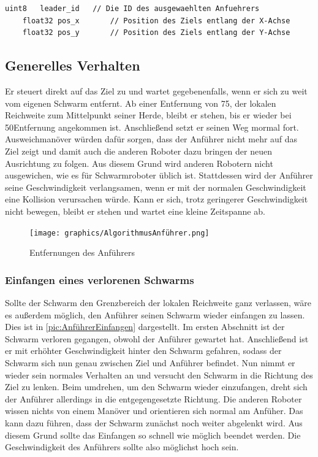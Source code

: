 \begin{lstlisting}[style=ros, title=Nachrichten-Typ: New\_Mission]
	uint8	leader_id	// Die ID des ausgewaehlten Anfuehrers
	float32 pos_x		// Position des Ziels entlang der X-Achse
	float32 pos_y		// Position des Ziels entlang der Y-Achse
\end{lstlisting}

\subsection*{Generelles Verhalten}

Er steuert direkt auf das Ziel zu und wartet gegebenenfalls, wenn er sich zu weit vom eigenen Schwarm entfernt. Ab einer Entfernung von 75\per, der lokalen Reichweite zum Mittelpunkt seiner Herde, bleibt er stehen, bis er wieder bei 50\per Entfernung angekommen ist. Anschließend setzt er seinen Weg mormal fort. Ausweichmanöver würden dafür sorgen, dass der Anführer nicht mehr auf das Ziel zeigt und damit auch die anderen Roboter dazu bringen der neuen Ausrichtung zu folgen. Aus diesem Grund wird anderen Robotern nicht ausgewichen, wie es für Schwarmroboter üblich ist. Stattdessen wird der Anführer seine Geschwindigkeit verlangsamen, wenn er mit der normalen Geschwindigkeit eine Kollision verursachen würde. Kann er sich, trotz geringerer Geschwindigkeit nicht bewegen, bleibt er stehen und wartet eine kleine Zeitspanne ab.

\begin{figure}
	\texttt{[image: graphics/AlgorithmusAnführer.png]}
	\caption{Entfernungen des Anführers}
	\label{pic:AnführerReichweiten}
\end{figure}

\subsubsection*{Einfangen eines verlorenen Schwarms}\label{subsubsec:AnführerEinfangen}
Sollte der Schwarm den Grenzbereich der lokalen Reichweite ganz verlassen, wäre es außerdem möglich, den Anführer seinen Schwarm wieder einfangen zu lassen. Dies ist in \autoref{pic:AnführerEinfangen} dargestellt.
Im ersten Abschnitt ist der Schwarm verloren gegangen, obwohl der Anführer gewartet hat. Anschließend ist er mit erhöhter Geschwindigkeit hinter den Schwarm gefahren, sodass der Schwarm sich nun genau zwischen Ziel und Anführer befindet. Nun nimmt er wieder sein normales Verhalten an und versucht den Schwarm in die Richtung des Ziel zu lenken. Beim umdrehen, um den Schwarm wieder einzufangen, dreht sich der Anführer allerdings in die entgegengesetzte Richtung. Die anderen Roboter wissen nichts von einem Manöver und orientieren sich normal am Anfüher. Das kann dazu führen, dass der Schwarm zunächst noch weiter abgelenkt wird. Aus diesem Grund sollte das Einfangen so schnell wie möglich beendet werden. Die Geschwindigkeit des Anführers sollte also möglichst hoch sein.

